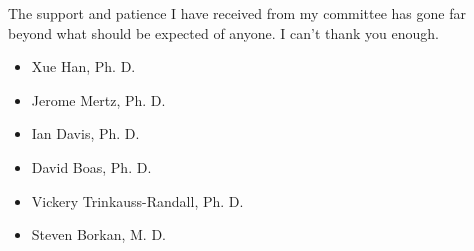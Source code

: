 The support and patience I have received from my committee has gone far beyond what should be expected of anyone.
I can't thank you enough.
\begin{itemize}
	\item Xue Han, Ph.
	      D.
	\item Jerome Mertz, Ph.
	      D.
	\item Ian Davis, Ph.
	      D.
	\item David Boas, Ph.
	      D.
	\item Vickery Trinkauss-Randall, Ph.
	      D.
	\item Steven Borkan, M.
	      D.
\end{itemize}

\vskip 1in

